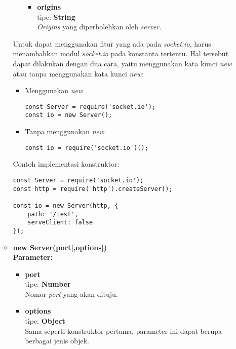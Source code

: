 \begin{enumerate}
\begin{itemize}
\begin{itemize}
\begin{itemize}
				\item \textbf{origins} \\ tipe: \textbf{String} \\ \textit{Origins} yang diperbolehkan oleh \textit{server}.
				
			\end{itemize}
		\end{itemize}
	
		Untuk dapat menggunakan fitur yang ada pada \textit{socket.io}, harus menambahkan modul \textit{socket.io} pada konstanta tertentu. Hal tersebut dapat dilakukan dengan dua cara, yaitu menggunakan kata kunci \textit{new} atau tanpa menggunakan kata kunci \textit{new}:
		
		\begin{itemize}
			\item Menggunakan \textit{new}
\begin{lstlisting}
const Server = require('socket.io');
const io = new Server();
\end{lstlisting}
			
			\item Tanpa menggunakan \textit{new}
\begin{lstlisting}
const io = require('socket.io')();
\end{lstlisting}
\end{itemize}
	
	Contoh implementasi konstruktor:
	
\begin{lstlisting}
const Server = require('socket.io');
const http = require('http').createServer();
		
const io = new Server(http, {
	path: '/test',
	serveClient: false
});
\end{lstlisting}
	
	\item \textbf{new Server(port[,options])} \\
	\textbf{Parameter:}
	\begin{itemize}
		\item \textbf{port} \\ tipe: \textbf{Number} \\ Nomor \textit{port} yang akan dituju.
		\item \textbf{options} \\ tipe: \textbf{Object} \\ Sama seperti konstruktor pertama, parameter ini dapat berupa berbagai jenis objek.
	\end{itemize}
	

\end{itemize}
\end{enumerate}
